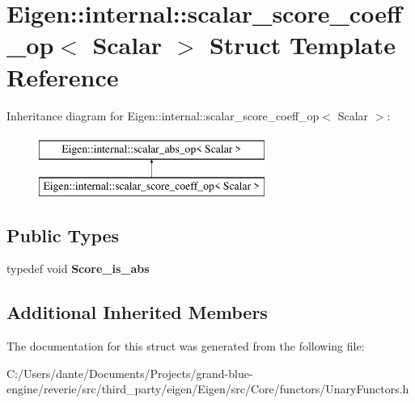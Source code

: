 \hypertarget{struct_eigen_1_1internal_1_1scalar__score__coeff__op}{}\section{Eigen\+::internal\+::scalar\+\_\+score\+\_\+coeff\+\_\+op$<$ Scalar $>$ Struct Template Reference}
\label{struct_eigen_1_1internal_1_1scalar__score__coeff__op}
Inheritance diagram for Eigen\+::internal\+::scalar\+\_\+score\+\_\+coeff\+\_\+op$<$ Scalar $>$\+:\begin{figure}[H]
\begin{center}
\leavevmode
\includegraphics[height=2.000000cm]{struct_eigen_1_1internal_1_1scalar__score__coeff__op}
\end{center}
\end{figure}
\subsection*{Public Types}
\begin{DoxyCompactItemize}
\item 
\mbox{\label{struct_eigen_1_1internal_1_1scalar__score__coeff__op_a99a09ca4f3cc9013543c01154aff8d8c}} 
typedef void {\bfseries Score\+\_\+is\+\_\+abs}
\end{DoxyCompactItemize}
\subsection*{Additional Inherited Members}


The documentation for this struct was generated from the following file\+:\begin{DoxyCompactItemize}
\item 
C\+:/\+Users/dante/\+Documents/\+Projects/grand-\/blue-\/engine/reverie/src/third\+\_\+party/eigen/\+Eigen/src/\+Core/functors/Unary\+Functors.\+h\end{DoxyCompactItemize}
